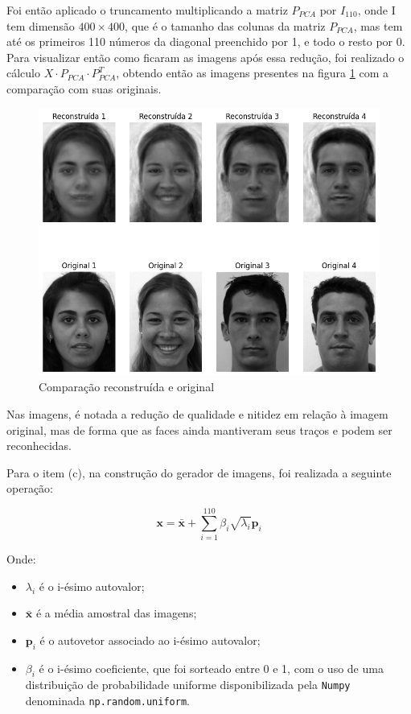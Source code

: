 \documentclass[a4paper, 11pt]{article}
\begin{document}
Foi então aplicado o truncamento multiplicando a matriz $P_{PCA}$ por $I_{110}$, onde I tem dimensão $400\times 400$, que é o tamanho das colunas da matriz $P_{PCA}$, mas tem até os primeiros 110 números da diagonal preenchido por 1, e todo o resto por 0. Para visualizar então como ficaram as imagens após essa redução, foi realizado o cálculo $X \cdot P_{PCA} \cdot P_{PCA}^T$, obtendo então as imagens presentes na figura \ref{fig:com} com a comparação com suas originais. 

\begin{figure} [H]
    \centering 
    \includegraphics[width=1.0\textwidth]{imgs/comparacao-imagens.png}
    \caption{Comparação reconstruída e original}
    \label{fig:com} %
\end{figure}

Nas imagens, é notada a redução de qualidade e nitidez em relação à imagem original, mas de forma que as faces ainda mantiveram seus traços e podem ser reconhecidas.

Para o item (c), na construção do gerador de imagens, foi realizada a seguinte operação:

\begin{equation}
\mathbf{x} = \bar{\mathbf{x}} + \sum_{i=1}^{110}  \beta_i \sqrt{\lambda_i} \mathbf{p}_i    
\end{equation}

Onde:

\begin{itemize}
    \item $\lambda_i$ é o i-ésimo autovalor;
    \item $\bar{\mathbf{x}}$ é a média amostral das imagens;
    \item $\mathbf{p}_i$ é o autovetor associado ao i-ésimo autovalor;
    \item $\beta_i$ é o i-ésimo coeficiente, que foi sorteado entre 0 e 1, com o uso de uma distribuição de probabilidade uniforme disponibilizada pela \texttt{Numpy} denominada \texttt{np.random.uniform}.
\end{itemize}
\end{document}
